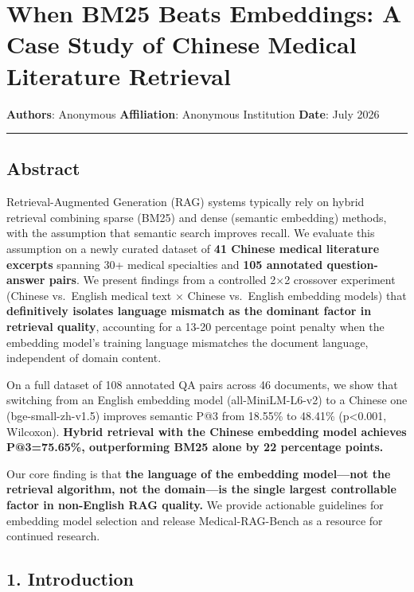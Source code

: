 \documentclass[
]{article}
\author{}
\date{}
\begin{document}
\section{When BM25 Beats Embeddings: A Case Study of Chinese Medical
Literature
Retrieval}\label{when-bm25-beats-embeddings-a-case-study-of-chinese-medical-literature-retrieval}

\textbf{Authors}: Anonymous \textbf{Affiliation}: Anonymous Institution
\textbf{Date}: July 2026

\begin{center}\rule{0.5\linewidth}{0.5pt}\end{center}

\subsection{Abstract}\label{abstract}

Retrieval-Augmented Generation (RAG) systems typically rely on hybrid
retrieval combining sparse (BM25) and dense (semantic embedding)
methods, with the assumption that semantic search improves recall. We
evaluate this assumption on a newly curated dataset of \textbf{41
Chinese medical literature excerpts} spanning 30+ medical specialties
and \textbf{105 annotated question-answer pairs}. We present findings
from a controlled 2×2 crossover experiment (Chinese vs.~English medical
text × Chinese vs.~English embedding models) that \textbf{definitively
isolates language mismatch as the dominant factor in retrieval quality},
accounting for a 13-20 percentage point penalty when the embedding
model's training language mismatches the document language, independent
of domain content.

On a full dataset of 108 annotated QA pairs across 46 documents, we show
that switching from an English embedding model (all-MiniLM-L6-v2) to a
Chinese one (bge-small-zh-v1.5) improves semantic P@3 from 18.55\% to
48.41\% (p\textless0.001, Wilcoxon). \textbf{Hybrid retrieval with the
Chinese embedding model achieves P@3=75.65\%, outperforming BM25 alone
by 22 percentage points.}

Our core finding is that \textbf{the language of the embedding
model---not the retrieval algorithm, not the domain---is the single
largest controllable factor in non-English RAG quality.} We provide
actionable guidelines for embedding model selection and release
Medical-RAG-Bench as a resource for continued research.

\subsection{1. Introduction}\label{introduction}
\end{document}
